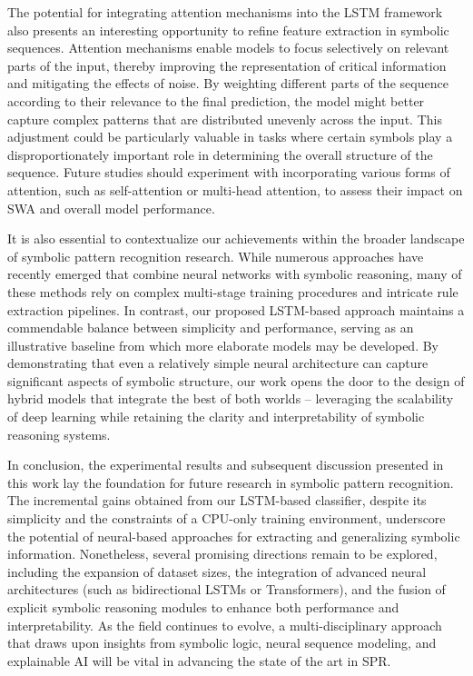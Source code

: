 \documentclass{article}
\begin{document}
The potential for integrating attention mechanisms into the LSTM framework also presents an interesting opportunity to refine feature extraction in symbolic sequences. Attention mechanisms enable models to focus selectively on relevant parts of the input, thereby improving the representation of critical information and mitigating the effects of noise. By weighting different parts of the sequence according to their relevance to the final prediction, the model might better capture complex patterns that are distributed unevenly across the input. This adjustment could be particularly valuable in tasks where certain symbols play a disproportionately important role in determining the overall structure of the sequence. Future studies should experiment with incorporating various forms of attention, such as self-attention or multi-head attention, to assess their impact on SWA and overall model performance.

It is also essential to contextualize our achievements within the broader landscape of symbolic pattern recognition research. While numerous approaches have recently emerged that combine neural networks with symbolic reasoning, many of these methods rely on complex multi-stage training procedures and intricate rule extraction pipelines. In contrast, our proposed LSTM-based approach maintains a commendable balance between simplicity and performance, serving as an illustrative baseline from which more elaborate models may be developed. By demonstrating that even a relatively simple neural architecture can capture significant aspects of symbolic structure, our work opens the door to the design of hybrid models that integrate the best of both worlds – leveraging the scalability of deep learning while retaining the clarity and interpretability of symbolic reasoning systems.

In conclusion, the experimental results and subsequent discussion presented in this work lay the foundation for future research in symbolic pattern recognition. The incremental gains obtained from our LSTM-based classifier, despite its simplicity and the constraints of a CPU-only training environment, underscore the potential of neural-based approaches for extracting and generalizing symbolic information. Nonetheless, several promising directions remain to be explored, including the expansion of dataset sizes, the integration of advanced neural architectures (such as bidirectional LSTMs or Transformers), and the fusion of explicit symbolic reasoning modules to enhance both performance and interpretability. As the field continues to evolve, a multi-disciplinary approach that draws upon insights from symbolic logic, neural sequence modeling, and explainable AI will be vital in advancing the state of the art in SPR.
\end{document}
